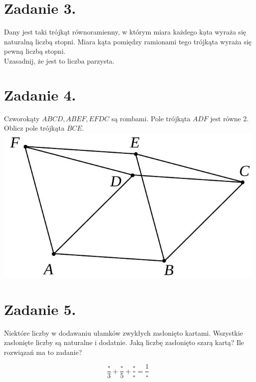 \documentclass[10pt]{article}
\begin{document}
\section*{Zadanie 3.}
Dany jest taki trójkąt równoramienny, w którym miara każdego kạta wyraża się naturalną liczbą stopni. Miara kąta pomiędzy ramionami tego trójkąta wyraża się pewną liczbą stopni.\\
Uzasadnij, że jest to liczba parzysta.

\section*{Zadanie 4.}
Czworokąty \(A B C D, A B E F, E F D C\) są rombami. Pole trójkąta \(A D F\) jest równe 2.\\
Oblicz pole trójkąta \(B C E\).\\
\includegraphics[max width=\textwidth, center]{2024_11_21_1d3b8ece52cfa609efbfg-1}

\section*{Zadanie 5.}
Niektóre liczby w dodawaniu ułamków zwykłych zasłonięto kartami. Wszystkie zasłonięte liczby są naturalne i dodatnie. Jaką liczbę zasłonięto szarą kartą? Ile rozwiązań ma to zadanie?

\[
\frac{\square}{3}+\frac{\square}{5}+\frac{\square}{\square}=\frac{1}{\square}
\]
\end{document}
